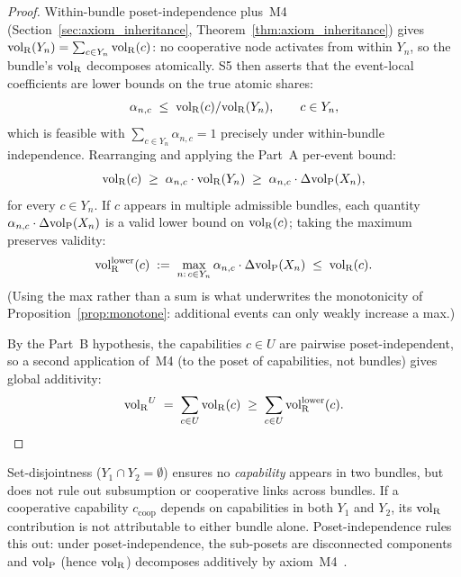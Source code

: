 \begin{proof}
Within-bundle poset-independence plus~M4
(Section~\ref{sec:axiom_inheritance},
Theorem~\ref{thm:axiom_inheritance}) gives
${\operatorname{vol}_{\mathrm{R}}}(Y_n) = \sum_{c \in Y_n} {\operatorname{vol}_{\mathrm{R}}}(c)$: no cooperative node
activates from within $Y_n$, so the bundle's ${\operatorname{vol}_{\mathrm{R}}}$ decomposes
atomically.  S5 then asserts that the event-local coefficients
are lower bounds on the true atomic shares:
\[
  \alpha_{n,c} \;\leq\; {\operatorname{vol}_{\mathrm{R}}}(c) / {\operatorname{vol}_{\mathrm{R}}}(Y_n),
  \qquad c \in Y_n,
\]
which is feasible with $\sum_{c \in Y_n} \alpha_{n,c} = 1$
precisely under within-bundle independence.  Rearranging and
applying the Part~A per-event bound:
\[
  {\operatorname{vol}_{\mathrm{R}}}(c) \;\geq\; \alpha_{n,c} \cdot {\operatorname{vol}_{\mathrm{R}}}(Y_n)
  \;\geq\; \alpha_{n,c} \cdot \Delta{\operatorname{vol}_{\mathrm{P}}}(X_n),
\]
for every $c \in Y_n$.  If $c$ appears in multiple admissible
bundles, each quantity $\alpha_{n,c} \cdot \Delta{\operatorname{vol}_{\mathrm{P}}}(X_n)$ is a
valid lower bound on ${\operatorname{vol}_{\mathrm{R}}}(c)$; taking the maximum preserves
validity:
\[
  {\operatorname{vol}_{\mathrm{R}}^{\mathrm{lower}}}(c) \;:=\;
  \max_{n:\, c \in Y_n} \alpha_{n,c} \cdot \Delta{\operatorname{vol}_{\mathrm{P}}}(X_n)
  \;\leq\; {\operatorname{vol}_{\mathrm{R}}}(c).
\]
(Using the max rather than a sum is what underwrites the
monotonicity of Proposition~\ref{prop:monotone}: additional
events can only weakly increase a max.)

By the Part~B hypothesis, the capabilities $c \in U$ are
pairwise poset-independent, so a second application of~M4
(to the poset of capabilities, not bundles) gives global
additivity:
\[
  {\operatorname{vol}_{\mathrm{R}}}^U \;=\; \sum_{c \in U} {\operatorname{vol}_{\mathrm{R}}}(c)
  \;\geq\; \sum_{c \in U} {\operatorname{vol}_{\mathrm{R}}^{\mathrm{lower}}}(c).
\]
\end{proof}

\begin{remark}
\label{rem:poset_indep}
Set-disjointness ($Y_1 \cap Y_2 = \emptyset$) ensures no
\emph{capability} appears in two bundles, but does not rule out
subsumption or cooperative links across bundles.  If a cooperative
capability $c_{\mathrm{coop}}$ depends on capabilities in both
$Y_1$ and $Y_2$, its ${\operatorname{vol}_{\mathrm{R}}}$ contribution is not attributable to
either bundle alone.  Poset-independence rules this out: under
poset-independence, the sub-posets are disconnected components
and ${\operatorname{vol}_{\mathrm{P}}}$ (hence ${\operatorname{vol}_{\mathrm{R}}}$) decomposes additively by
axiom~M4~\citep[Proposition~1]{lasser2026poset}.
\end{remark}

